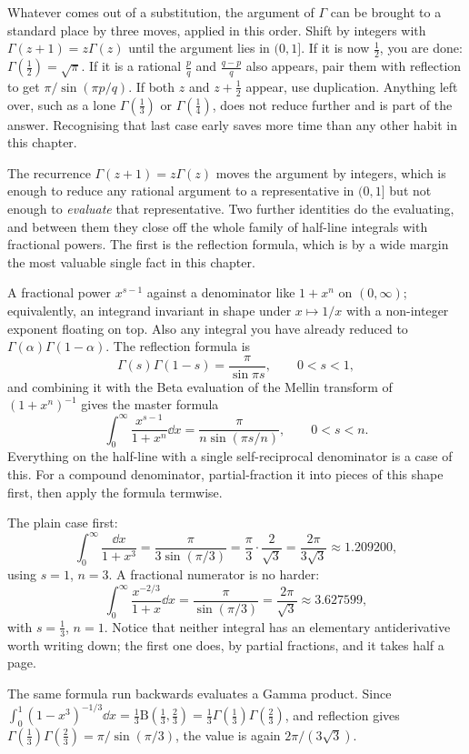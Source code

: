 \begin{keynote}
Whatever comes out of a substitution, the argument of $\Gamma$ can be brought to a standard place by three moves, applied in this order. Shift by integers with $\Gamma(z+1)=z\Gamma(z)$ until the argument lies in $(0,1]$. If it is now $\tfrac12$, you are done: $\Gamma(\tfrac12)=\sqrt\pi$. If it is a rational $\tfrac pq$ and $\tfrac{q-p}{q}$ also appears, pair them with reflection to get $\pi/\sin(\pi p/q)$. If both $z$ and $z+\tfrac12$ appear, use duplication. Anything left over, such as a lone $\Gamma(\tfrac13)$ or $\Gamma(\tfrac14)$, does not reduce further and is part of the answer. Recognising that last case early saves more time than any other habit in this chapter.
\end{keynote}

The recurrence $\Gamma(z+1)=z\Gamma(z)$ moves the argument by integers, which is enough to reduce any rational argument to a representative in $(0,1]$ but not enough to \emph{evaluate} that representative. Two further identities do the evaluating, and between them they close off the whole family of half-line integrals with fractional powers. The first is the reflection formula, which is by a wide margin the most valuable single fact in this chapter.

\cue A fractional power $x^{s-1}$ against a denominator like $1+x^{n}$ on $(0,\infty)$; equivalently, an integrand invariant in shape under $x\mapsto1/x$ with a non-integer exponent floating on top. Also any integral you have already reduced to $\Gamma(\alpha)\Gamma(1-\alpha)$.
\method The reflection formula is
\[\Gamma(s)\Gamma(1-s)=\frac{\pi}{\sin\pi s},\qquad 0<s<1,\]
and combining it with the Beta evaluation of the Mellin transform of $(1+x^{n})^{-1}$ gives the master formula
\[\int_0^{\infty}\frac{x^{s-1}}{1+x^{n}}\dd x=\frac{\pi}{n\sin(\pi s/n)},\qquad 0<s<n.\]
Everything on the half-line with a single self-reciprocal denominator is a case of this. For a compound denominator, partial-fraction it into pieces of this shape first, then apply the formula termwise.

\begin{worked}
The plain case first:
\[\int_0^{\infty}\frac{\dd x}{1+x^{3}}=\frac{\pi}{3\sin(\pi/3)}=\frac{\pi}{3}\cdot\frac{2}{\sqrt3}=\frac{2\pi}{3\sqrt3}\approx1.209200,\]
using $s=1$, $n=3$. A fractional numerator is no harder:
\[\int_0^{\infty}\frac{x^{-2/3}}{1+x}\dd x=\frac{\pi}{\sin(\pi/3)}=\frac{2\pi}{\sqrt3}\approx3.627599,\]
with $s=\tfrac13$, $n=1$. Notice that neither integral has an elementary antiderivative worth writing down; the first one does, by partial fractions, and it takes half a page.

The same formula run backwards evaluates a Gamma product. Since $\int_0^1(1-x^{3})^{-1/3}\dd x=\tfrac13\mathrm{B}(\tfrac13,\tfrac23)=\tfrac13\Gamma(\tfrac13)\Gamma(\tfrac23)$, and reflection gives $\Gamma(\tfrac13)\Gamma(\tfrac23)=\pi/\sin(\pi/3)$, the value is again $2\pi/(3\sqrt3)$.
\end{worked}

